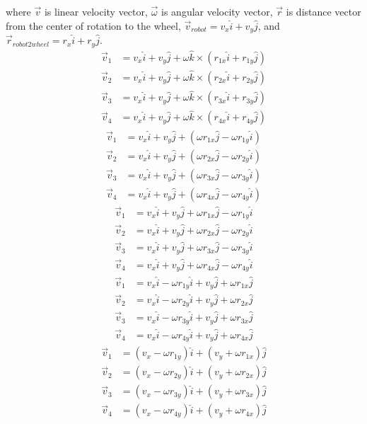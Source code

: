where $\vec{v}$ is linear velocity vector, $\vec{\omega}$ is angular velocity
vector, $\vec{r}$ is distance vector from the center of rotation to the wheel,
$\vec{v}_{robot} = v_x \hat{i} + v_y \hat{j}$, and
$\vec{r}_{robot2wheel} = r_x \hat{i} + r_y \hat{j}$.
\begin{align*}
  \vec{v}_1 &= v_x \hat{i} + v_y \hat{j} + \omega \hat{k} \times
    (r_{1x} \hat{i} + r_{1y} \hat{j}) \\
  \vec{v}_2 &= v_x \hat{i} + v_y \hat{j} + \omega \hat{k} \times
    (r_{2x} \hat{i} + r_{2y} \hat{j}) \\
  \vec{v}_3 &= v_x \hat{i} + v_y \hat{j} + \omega \hat{k} \times
    (r_{3x} \hat{i} + r_{3y} \hat{j}) \\
  \vec{v}_4 &= v_x \hat{i} + v_y \hat{j} + \omega \hat{k} \times
    (r_{4x} \hat{i} + r_{4y} \hat{j})
\end{align*}
\begin{align*}
  \vec{v}_1 &= v_x \hat{i} + v_y \hat{j} +
    (\omega r_{1x} \hat{j} - \omega r_{1y} \hat{i}) \\
  \vec{v}_2 &= v_x \hat{i} + v_y \hat{j} +
    (\omega r_{2x} \hat{j} - \omega r_{2y} \hat{i}) \\
  \vec{v}_3 &= v_x \hat{i} + v_y \hat{j} +
    (\omega r_{3x} \hat{j} - \omega r_{3y} \hat{i}) \\
  \vec{v}_4 &= v_x \hat{i} + v_y \hat{j} +
    (\omega r_{4x} \hat{j} - \omega r_{4y} \hat{i})
\end{align*}
\begin{align*}
  \vec{v}_1 &= v_x \hat{i} + v_y \hat{j} +
    \omega r_{1x} \hat{j} - \omega r_{1y} \hat{i} \\
  \vec{v}_2 &= v_x \hat{i} + v_y \hat{j} +
    \omega r_{2x} \hat{j} - \omega r_{2y} \hat{i} \\
  \vec{v}_3 &= v_x \hat{i} + v_y \hat{j} +
    \omega r_{3x} \hat{j} - \omega r_{3y} \hat{i} \\
  \vec{v}_4 &= v_x \hat{i} + v_y \hat{j} +
    \omega r_{4x} \hat{j} - \omega r_{4y} \hat{i}
\end{align*}
\begin{align*}
  \vec{v}_1 &= v_x \hat{i} - \omega r_{1y} \hat{i} +
    v_y \hat{j} + \omega r_{1x} \hat{j} \\
  \vec{v}_2 &= v_x \hat{i} - \omega r_{2y} \hat{i} +
    v_y \hat{j} + \omega r_{2x} \hat{j} \\
  \vec{v}_3 &= v_x \hat{i} - \omega r_{3y} \hat{i} +
    v_y \hat{j} + \omega r_{3x} \hat{j} \\
  \vec{v}_4 &= v_x \hat{i} - \omega r_{4y} \hat{i} +
    v_y \hat{j} + \omega r_{4x} \hat{j}
\end{align*}
\begin{align*}
  \vec{v}_1 &= (v_x - \omega r_{1y}) \hat{i} + (v_y + \omega r_{1x}) \hat{j} \\
  \vec{v}_2 &= (v_x - \omega r_{2y}) \hat{i} + (v_y + \omega r_{2x}) \hat{j} \\
  \vec{v}_3 &= (v_x - \omega r_{3y}) \hat{i} + (v_y + \omega r_{3x}) \hat{j} \\
  \vec{v}_4 &= (v_x - \omega r_{4y}) \hat{i} + (v_y + \omega r_{4x}) \hat{j}
\end{align*}

